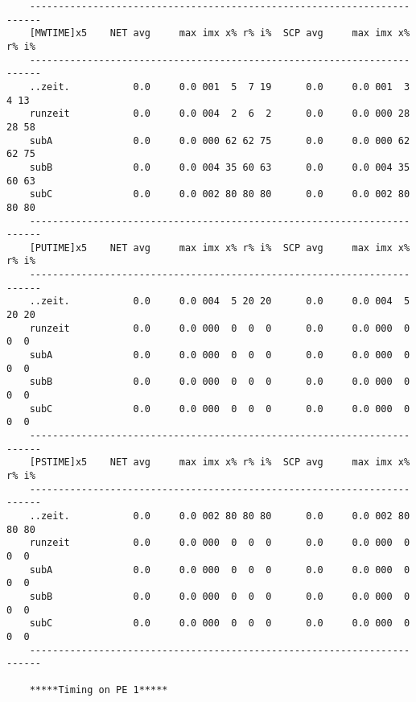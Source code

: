 \begin{verbatim}
    ------------------------------------------------------------------------
    [MWTIME]x5    NET avg     max imx x% r% i%  SCP avg     max imx x% r% i%
    ------------------------------------------------------------------------
    ..zeit.           0.0     0.0 001  5  7 19      0.0     0.0 001  3  4 13
    runzeit           0.0     0.0 004  2  6  2      0.0     0.0 000 28 28 58
    subA              0.0     0.0 000 62 62 75      0.0     0.0 000 62 62 75
    subB              0.0     0.0 004 35 60 63      0.0     0.0 004 35 60 63
    subC              0.0     0.0 002 80 80 80      0.0     0.0 002 80 80 80
    ------------------------------------------------------------------------
    [PUTIME]x5    NET avg     max imx x% r% i%  SCP avg     max imx x% r% i%
    ------------------------------------------------------------------------
    ..zeit.           0.0     0.0 004  5 20 20      0.0     0.0 004  5 20 20
    runzeit           0.0     0.0 000  0  0  0      0.0     0.0 000  0  0  0
    subA              0.0     0.0 000  0  0  0      0.0     0.0 000  0  0  0
    subB              0.0     0.0 000  0  0  0      0.0     0.0 000  0  0  0
    subC              0.0     0.0 000  0  0  0      0.0     0.0 000  0  0  0
    ------------------------------------------------------------------------
    [PSTIME]x5    NET avg     max imx x% r% i%  SCP avg     max imx x% r% i%
    ------------------------------------------------------------------------
    ..zeit.           0.0     0.0 002 80 80 80      0.0     0.0 002 80 80 80
    runzeit           0.0     0.0 000  0  0  0      0.0     0.0 000  0  0  0
    subA              0.0     0.0 000  0  0  0      0.0     0.0 000  0  0  0
    subB              0.0     0.0 000  0  0  0      0.0     0.0 000  0  0  0
    subC              0.0     0.0 000  0  0  0      0.0     0.0 000  0  0  0
    ------------------------------------------------------------------------
    
    *****Timing on PE 1*****
    

\end{verbatim}
